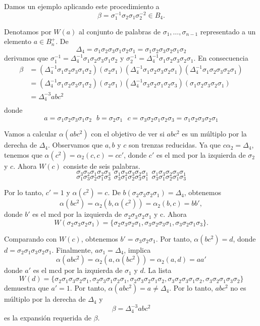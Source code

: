 \documentclass[12pt]{book}
\theoremstyle{definition}
\begin{document}
Damos un ejemplo aplicando este procedimiento a
$$\beta=\sigma_1^{-1}\sigma_2\sigma_1\sigma_2^{-2}\in B_4.$$

Denotamos por $W(a)$ al conjunto de palabras de $\sigma_1,\ldots,\sigma_{n-1}$ representado a un elemento $a\in B_n^+$. De
$$\Delta_4=\sigma_1\sigma_2\sigma_3\sigma_1\sigma_2\sigma_1=\sigma_1\sigma_2\sigma_3\sigma_2\sigma_1\sigma_2$$
derivamos que $\sigma_1^{-1}=\Delta_4^{-1}\sigma_1\sigma_2\sigma_3\sigma_1\sigma_2$ y $\sigma_2^{-1}=\Delta_4^{-1}\sigma_1\sigma_2\sigma_3\sigma_2\sigma_1$. En consecuencia
\begin{align*}
\beta&=(\Delta_4^{-1}\sigma_1\sigma_2\sigma_3\sigma_1\sigma_2)(\sigma_2\sigma_1)(\Delta_4^{-1}\sigma_1\sigma_2\sigma_3\sigma_2\sigma_1)(\Delta_4^{-1}\sigma_1\sigma_2\sigma_3\sigma_2\sigma_1)\\
&=(\Delta_4^{-1}\sigma_1\sigma_2\sigma_3\sigma_1\sigma_2)(\sigma_2\sigma_1)(\Delta_4^{-1}\sigma_3\sigma_2\sigma_1\sigma_2\sigma_3)(\sigma_1\sigma_2\sigma_3\sigma_2\sigma_1)\\
&=\Delta_4^{-3}abc^2\\
\end{align*} 
donde
$$a=\sigma_1\sigma_2\sigma_3\sigma_1\sigma_2\ \ \ b=\sigma_2\sigma_1\ \ \ c=\sigma_3\sigma_2\sigma_1\sigma_2\sigma_3=\sigma_1\sigma_2\sigma_3\sigma_2\sigma_1$$

Vamos a calcular $\alpha(abc^2)$ con el objetivo de ver si $abc^2$ es un múltiplo por la derecha de $\Delta_4$. Observamos que $a,b$ y $c$ son trenzas reducidas. Ya que $c\alpha_2=\Delta_4$, tenemos que $\alpha(c^2)=\alpha_2(c,c)=cc'$, donde $c'$ es el mcd por la izquierda de $\sigma_2$ y $c$. Ahora $W(c)$ consiste de seis palabras.
$$\sigma_3\sigma_2\sigma_1\sigma_2\sigma_3\ \ \sigma_1\sigma_2\sigma_3\sigma_2\sigma_1\ \ \sigma_1\sigma_3\sigma_2\sigma_3\sigma_1$$
$$\sigma_1\sigma_3\sigma_2\sigma_1\sigma_3\ \ \sigma_3\sigma_1\sigma_2\sigma_3\sigma_1\ \ \sigma_3\sigma_1\sigma_2\sigma_1\sigma_3$$

Por lo tanto, $c'=1$ y $\alpha(c^2)=c$. De $b(\sigma_2\sigma_3\sigma_2\sigma_1)=\Delta_4$, obtenemos
$$\alpha(bc^2)=\alpha_2(b,\alpha(c^2))=\alpha_2(b,c)=bb',$$
donde $b'$ es el mcd por la izquierda de $\sigma_2\sigma_3\sigma_2\sigma_1$ y c. Ahora
$$W(\sigma_2\sigma_3\sigma_2\sigma_1)=\{\sigma_2\sigma_3\sigma_2\sigma_1,\sigma_3\sigma_2\sigma_3\sigma_1,\sigma_3\sigma_2\sigma_1\sigma_3\}.$$

Comparando con $W(c)$, obtenemos $b'=\sigma_3\sigma_2\sigma_1$. Por tanto, $\alpha(bc^2)=d$, donde $d=\sigma_2\sigma_1\sigma_3\sigma_2\sigma_1$. Finalmente, $a\sigma_1=\Delta_4$, implica
$$\alpha(abc^2)=\alpha_2(a,\alpha(bc^2))=\alpha_2(a,d)=aa'$$
donde $a'$ es el mcd por la izquierda de $\sigma_1$ y $d$. La lista
$$W(d)=\{\sigma_2\sigma_1\sigma_3\sigma_2\sigma_1,\sigma_2\sigma_3\sigma_1\sigma_2\sigma_1,
\sigma_2\sigma_3\sigma_2\sigma_1\sigma_2,\sigma_3\sigma_2\sigma_3\sigma_1\sigma_2,
\sigma_3\sigma_2\sigma_1\sigma_3\sigma_2\}$$
demuestra que $a'=1$. Por tanto, $\alpha(abc^2)=a\neq\Delta_4$. Por lo tanto, $abc^2$ no es múltiplo por la derecha de $\Delta_4$ y 
$$\beta=\Delta_4^{-3}abc^2$$
es la expansión requerida de $\beta$.
\end{document}
